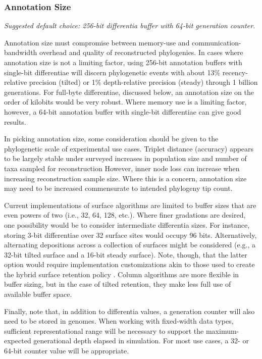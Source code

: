 \subsubsection{Annotation Size}
\textit{Suggested default choice: 256-bit differentia buffer with 64-bit generation counter.}

Annotation size must compromise between memory-use and communication-bandwidth overhead and quality of reconstructed phylogenies.
In cases where annotation size is not a limiting factor, using 256-bit annotation buffers with single-bit differentiae will discern phylogenetic events with about 13\% recency-relative precision (tilted) or 1\% depth-relative precision (steady) through 1 billion generations.
For full-byte differentiae, discussed below, an annotation size on the order of kilobits would be very robust.
Where memory use is a limiting factor, however, a 64-bit annotation buffer with single-bit differentiae can give good results.

In picking annotation size, some consideration should be given to the phylogenetic scale of experimental use cases.
Triplet distance (accuracy) appears to be largely stable under surveyed increases in population size and number of taxa sampled for reconstruction
However, inner node loss can increase when increasing reconstruction sample size.
Where this is a concern, annotation size may need to be increased commensurate to intended phylogeny tip count.

Current implementations of surface algorithms are limited to buffer sizes that are even powers of two (i.e., 32, 64, 128, etc.).
Where finer gradations are desired, one possibility would be to consider intermediate differentia sizes.
For instance, storing 3-bit differentiae over 32 surface sites would occupy 96 bits.
Alternatively, alternating depositions across a collection of surfaces might be considered (e.g., a 32-bit tilted surface and a 16-bit steady surface).
Note, though, that the latter option would require implementation customizations akin to those used to create the hybrid surface retention policy \citep{moreno2024hsurf}.
Column algorithms are more flexible in buffer sizing, but in the case of tilted retention, they make less full use of available buffer space.

Finally, note that, in addition to differentia values, a generation counter will also need to be stored in genomes.
When working with fixed-width data types, sufficient representational range will be necessary to support the maximum-expected generational depth elapsed in simulation.
For most use cases, a 32- or 64-bit counter value will be appropriate.

